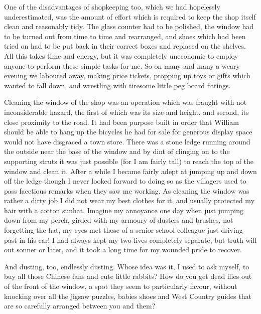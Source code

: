 One of the disadvantages of shopkeeping too, which we had hopelessly underestimated, was the amount of effort which is required to keep the shop itself clean and reasonably tidy. The glass counter had to be polished, the window had to be turned out from time to time and rearranged, and shoes which had been tried on had to be put back in their correct boxes and replaced on the shelves. All this takes time and energy, but it was completely uneconomic to employ anyone to perform these simple tasks for me. So on many and many a weary evening we laboured away, making price tickets, propping up toys or gifts which wanted to fall down, and wrestling with tiresome little peg board fittings. 

Cleaning the window of the shop was an operation which was fraught with not inconsiderable hazard, the first of which was its size and height, and second, its close proximity to the road. It had been purpose built in order that William should be able to hang up the bicycles he had for sale for generous display space would not have disgraced a town store. There was a stone ledge running around the outside near the base of the window and by dint of clinging on to the supporting struts it was just possible (for I am fairly tall) to reach the top of the window and clean it. After a while I became fairly adept at jumping up and down off the ledge though I never looked forward to doing so as the villagers used to pass facetious remarks when they saw me working. As cleaning the window was rather a dirty job I did not wear my best clothes for it, and usually protected my hair with a cotton sunhat. Imagine my annoyance one day when just jumping down from my perch, girded with my armoury of dusters and brushes, not forgetting the hat, my eyes met those of a senior school colleague just driving past in his car! I had always kept my two lives completely separate, but truth will out sonner or later, and it took a long time for my wounded pride to recover.

And dusting, too, endlessly dusting. Whose idea was it, I used to ask myself, to buy all those Chinese fans and cute little rabbits? How do you get dead flies out of the front of the window, a spot they seem to particularly favour, without knocking over all the jigsaw puzzles, babies shoes and West Country guides that are so carefully arranged between you and them?

